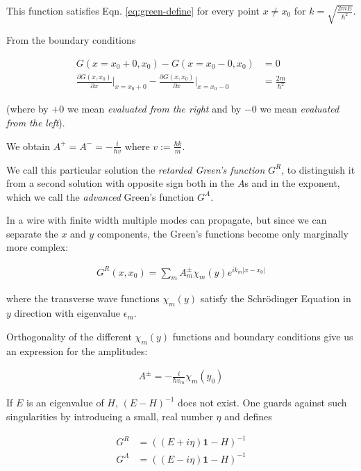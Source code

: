 \documentclass[11pt,twoside]{book}
\begin{document}
This function satisfies Eqn. \ref{eq:green-define} for every point $x \not=
x_0$  for $ k = \sqrt{\frac{2mE}{\hbar^2}}$.

From the boundary conditions

\begin{align}
    G(x = x_0 + 0, x_0) - G(x = x_0 - 0, x_0) &= 0 \\
    \frac{\partial G(x, x_0)}{\partial x}\left.\right|_{x=x_0 +0}
    -\frac{\partial G(x, x_0)}{\partial x}\left.\right|_{x=x_0 -0}
        &= \frac{2m}{\hbar^2}
\end{align}

(where by $+0$ we mean \emph{evaluated from the right} and by $-0$ we mean
\emph{evaluated from the left}).

We obtain $A^+ = A^- = -\frac{i}{\hbar v}$ where $v := \frac{\hbar k}{m} $.

We call this particular solution the \emph{retarded Green's function} $G^R$,
to distinguish it from a second solution with opposite sign both in the $A$s
and in the exponent, which we call the \emph{advanced} Green's function $G^A$.

In a wire with finite width multiple modes can propagate, but since we can
separate the $x$ and $y$ components, the Green's functions become only
marginally more complex:

\begin{align}
    G^R(x, x_0) = \sum_m A^\pm_m \chi_m(y) e^{i k_m |x - x_0|}
\end{align}

where the transverse wave functions $\chi_m(y)$ satisfy the Schrödinger
Equation in $y$ direction with eigenvalue $\epsilon_m$.

Orthogonality of the different $\chi_m(y)$ functions and boundary conditions
give us an expression for the amplitudes:

\begin{align}
    A^\pm = - \frac{i}{\hbar v_m} \chi_m(y_0)
\end{align}

If $E$ is an eigenvalue of $H$, $(E-H)^{-1}$ does not exist. One guards
against such singularities by introducing a small, real number $\eta$ and
defines

\begin{align}
    G^R &= \left( (E + i \eta)\mathbf{1} - H \right)^{-1}\\
    G^A &= \left( (E - i \eta)\mathbf{1} - H \right)^{-1}
\end{align}
\end{document}

